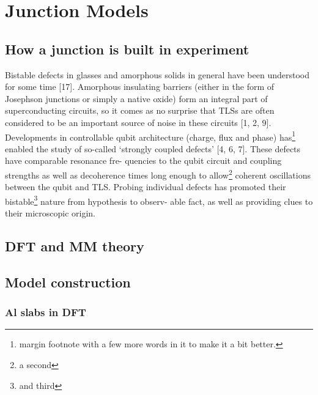 \chapter{Junction Models}

\section{How a junction is built in experiment}
Bistable defects  in glasses and amorphous solids in general have been understood for some time [17].
Amorphous insulating barriers (either in the form of Josephson junctions or simply a native oxide) form an integral part of superconducting circuits, so it comes as no surprise that TLSs are often considered to be an important source of noise in these circuits [1, 2, 9]. Developments in controllable
qubit architecture (charge, flux and phase) has\footnote{margin footnote with a few more words in it to make it a bit better.} enabled the study of so-called
‘strongly coupled defects’ [4, 6, 7]. These defects have comparable resonance fre-
quencies to the qubit circuit and coupling strengths as well as decoherence times
long enough to allow\footnote{a second} coherent oscillations between the qubit and TLS. Probing
individual defects has promoted their bistable\footnote{and third} nature from hypothesis to observ-
able fact, as well as providing clues to their microscopic origin.
\section{DFT and MM theory}
\section{Model construction}
\subsection{Al slabs in DFT}
